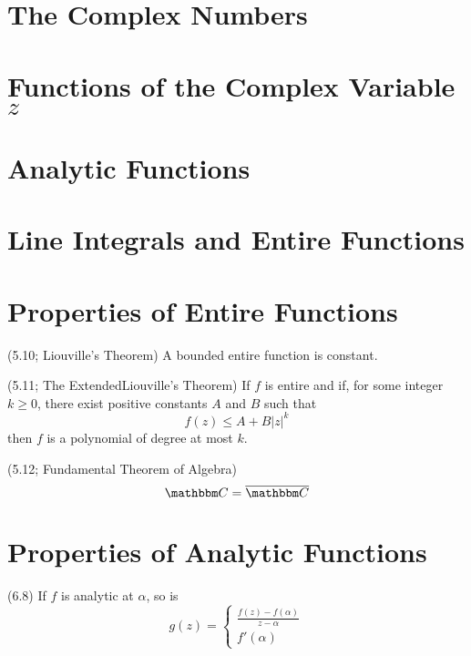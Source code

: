 \documentclass{article}
\begin{document}
\maketitle
\vspace{1pt}

\section{The Complex Numbers}
\section{Functions of the Complex Variable \(z\)}
\section{Analytic Functions}
\section{Line Integrals and Entire Functions}
\section{Properties of Entire Functions}

\begin{theorem}(5.10; Liouville's Theorem)
  A bounded entire function is constant.
\end{theorem}
\begin{theorem}(5.11; The ExtendedLiouville's Theorem)
  If \(f\) is entire and if, for some integer \(k \ge 0\),
  there exist positive constants \(A\) and \(B\) such that
  \[f(z) \le A + B|z|^k\]
  then \(f\) is a polynomial of degree at most \(k\).
\end{theorem}

\begin{theorem}(5.12; Fundamental Theorem of Algebra)
  \[\bbC = \overline{\bbC}\]
\end{theorem}

\section{Properties of Analytic Functions}

\begin{property}(6.8)
  If \(f\) is analytic at \(\alpha\), so is
  \[g(z) = \left\{\begin{array}{ll} \frac{f(z)-f(\alpha)}{z-\alpha} \\ f'(\alpha) \end{array}\right.\]
\end{property}
\end{document}
